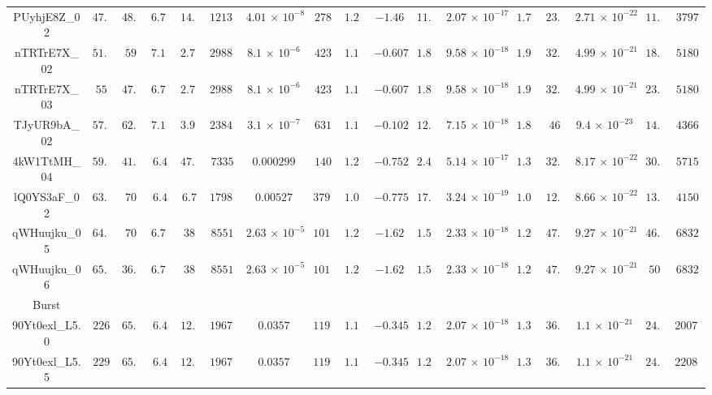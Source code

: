 \begin{appendix}
\begin{table}
\begin{tabular}{ccccccccccccccccc}
PUyhjE8Z\_02 & $ 47.5$ & $ 48.2$ & $ 6.75$ & $ 14.1$ & $ 12130$ & $ 4.01\,{\times}\,10^{-8}$ & $ 278$ & $ 1.28$ & $ -1.46$ & $ 11.4$ & $ 2.07\,{\times}\,10^{-17}$ & $ 1.76$ & $ 23.4$ & $ 2.71\,{\times}\,10^{-22}$ & $ 11.3$ & $ 3797$ \\ 
nTRTrE7X\_02 & $ 51.2$ & $ 59$ & $ 7.11$ & $ 2.71$ & $ 29889$ & $ 8.1\,{\times}\,10^{-6}$ & $ 423$ & $ 1.13$ & $ -0.607$ & $ 1.85$ & $ 9.58\,{\times}\,10^{-18}$ & $ 1.94$ & $ 32.7$ & $ 4.99\,{\times}\,10^{-21}$ & $ 18.1$ & $ 5180$ \\ 
nTRTrE7X\_03 & $ 55$ & $ 47.5$ & $ 6.75$ & $ 2.71$ & $ 29889$ & $ 8.1\,{\times}\,10^{-6}$ & $ 423$ & $ 1.13$ & $ -0.607$ & $ 1.85$ & $ 9.58\,{\times}\,10^{-18}$ & $ 1.94$ & $ 32.7$ & $ 4.99\,{\times}\,10^{-21}$ & $ 23.3$ & $ 5180$ \\ 
TJyUR9bA\_02 & $ 57.8$ & $ 62.6$ & $ 7.11$ & $ 3.91$ & $ 23840$ & $ 3.1\,{\times}\,10^{-7}$ & $ 631$ & $ 1.17$ & $ -0.102$ & $ 12.7$ & $ 7.15\,{\times}\,10^{-18}$ & $ 1.89$ & $ 46$ & $ 9.4\,{\times}\,10^{-23}$ & $ 14.4$ & $ 4366$ \\ 
4kW1TtMH\_04 & $ 59.1$ & $ 41.8$ & $ 6.4$ & $ 47.3$ & $ 7335$ & $ 0.000299$ & $ 140$ & $ 1.24$ & $ -0.752$ & $ 2.49$ & $ 5.14\,{\times}\,10^{-17}$ & $ 1.35$ & $ 32.9$ & $ 8.17\,{\times}\,10^{-22}$ & $ 30.6$ & $ 5715$ \\ 
lQ0YS3aF\_02 & $ 63.2$ & $ 70$ & $ 6.4$ & $ 6.7$ & $ 17980$ & $ 0.00527$ & $ 3798$ & $ 1.06$ & $ -0.775$ & $ 17.3$ & $ 3.24\,{\times}\,10^{-19}$ & $ 1.06$ & $ 12.5$ & $ 8.66\,{\times}\,10^{-22}$ & $ 13.5$ & $ 4150$ \\ 
qWHuujku\_05 & $ 64.4$ & $ 70$ & $ 6.75$ & $ 38$ & $ 8551$ & $ 2.63\,{\times}\,10^{-5}$ & $ 1015$ & $ 1.23$ & $ -1.62$ & $ 1.52$ & $ 2.33\,{\times}\,10^{-18}$ & $ 1.28$ & $ 47.8$ & $ 9.27\,{\times}\,10^{-21}$ & $ 46.8$ & $ 6832$ \\ 
qWHuujku\_06 & $ 65.2$ & $ 36.2$ & $ 6.75$ & $ 38$ & $ 8551$ & $ 2.63\,{\times}\,10^{-5}$ & $ 1015$ & $ 1.23$ & $ -1.62$ & $ 1.52$ & $ 2.33\,{\times}\,10^{-18}$ & $ 1.28$ & $ 47.8$ & $ 9.27\,{\times}\,10^{-21}$ & $ 50$ & $ 6832$ \\ 
\noalign{\smallskip} 
\hline 
Burst\\
\noalign{\smallskip} 
\hline 
\noalign{\smallskip} 
90Yt0exl\_L5.0 & $ 226$ & $ 65.5$ & $ 6.4$ & $ 12.3$ & $ 19670$ & $ 0.0357$ & $ 1191$ & $ 1.13$ & $ -0.345$ & $ 1.25$ & $ 2.07\,{\times}\,10^{-18}$ & $ 1.39$ & $ 36.4$ & $ 1.1\,{\times}\,10^{-21}$ & $ 24.1$ & $ 20078$ \\ 
90Yt0exl\_L5.5 & $ 229$ & $ 65.5$ & $ 6.4$ & $ 12.9$ & $ 19670$ & $ 0.0357$ & $ 1191$ & $ 1.13$ & $ -0.345$ & $ 1.25$ & $ 2.07\,{\times}\,10^{-18}$ & $ 1.39$ & $ 36.4$ & $ 1.1\,{\times}\,10^{-21}$ & $ 24.1$ & $ 22081$ \\ 

\end{tabular}
\end{table}
\end{appendix}
